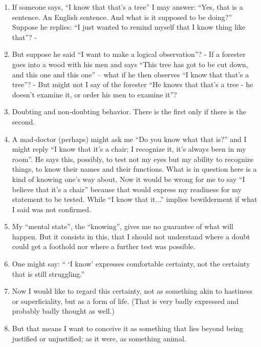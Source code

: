 \documentclass{book}
\begin{document}
\begin{enumerate}
\item
If someone says, ``I know that that's a tree'' I may answer: ``Yes, that is a
sentence. An English sentence. And what is it supposed to be doing?'' Suppose
he replies: ``I just wanted to remind myself that I know thing like that''? -

\item
But suppose he said ``I want to make a logical observation''? - If a forester
goes into a wood with his men and says ``This tree has got to be cut down, and
this one and this one'' -- what if he then observes ``I know that that's a
tree''? - But might not I say of the forester ``He knows that that's a tree -
he doesn't examine it, or order his men to examine it''?

\item
Doubting and non-doubting behavior. There is the first only if there is the
second.

\item
A mad-doctor (perhaps) might ask me ``Do you know what that is?'' and I might
reply ``I know that it's a chair; I recognize it, it's always been in my
room''. He says this, possibly, to test not my eyes but my ability to recognize
things, to know their names and their functions. What is in question here is a
kind of knowing one's way about. Now it would be wrong for me to say ``I
believe that it's a chair'' because that would express my readiness for my
statement to be tested. While ``I know that it...'' implies bewilderment if
what I said was not confirmed.

\item
My ``mental state'', the ``knowing'', gives me no guarantee of what will
happen. But it consists in this, that I should not understand where a doubt
could get a foothold nor where a further test was possible.

\item
One might say: `` `I know' expresses comfortable certainty, not the certainty
that is still struggling.''

\item
Now I would like to regard this certainty, not as something akin to hastiness
or superficiality, but as a form of life. (That is very badly expressed and
probably badly thought as well.)

\item
But that means I want to conceive it as something that lies beyond being
justified or unjustified; as it were, as something animal.


\end{enumerate}
\end{document}
